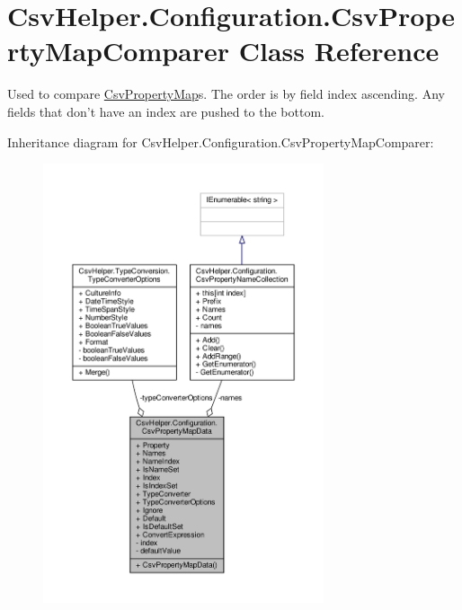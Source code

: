\hypertarget{a00071}{\section{Csv\-Helper.\-Configuration.\-Csv\-Property\-Map\-Comparer Class Reference}
\label{a00071}
}


Used to compare \hyperlink{a00069}{Csv\-Property\-Map}s. The order is by field index ascending. Any fields that don't have an index are pushed to the bottom.  




Inheritance diagram for Csv\-Helper.\-Configuration.\-Csv\-Property\-Map\-Comparer\-:
\nopagebreak
\begin{figure}[H]
\begin{center}
\leavevmode
\includegraphics[width=234pt]{a00468}
\end{center}
\end{figure}


